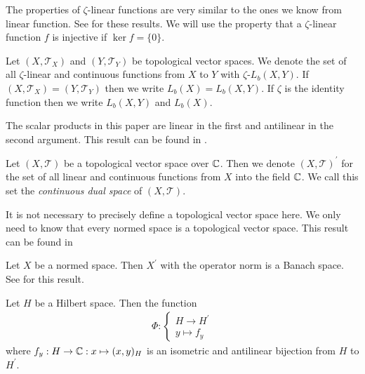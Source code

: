\begin{remark}
	The properties of $\zeta$-linear functions are very similar to the ones we know from linear function. See \cite[p. 138]{LinAG1&2} for these results. We will use the property that a $\zeta$-linear function $f$ is injective if $\ker f = \{0\}$.
\end{remark}


\begin{definition}
	Let $(X,\mathcal{T}_X)$ and $(Y,\mathcal{T}_Y)$ be topological vector spaces. We denote the set of all $\zeta$-linear and continuous functions from $X$ to $Y$ with $\zeta$-$L_b(X,Y)$. If $(X, \mathcal{T}_X) = (Y, \mathcal{T}_Y)$ then we write $L_b(X) = L_b(X,Y)$. If $\zeta$ is the identity function then we write $L_b(X,Y)$ and $L_b(X)$.
\end{definition}


\begin{remark}
	The scalar products in this paper are linear in the first and antilinear in the second argument. This result can be found in \cite[p. 41]{FAna1}.
\end{remark}

\begin{definition}
	Let $(X, \mathcal{T})$ be a topological vector space over $\mathbb{C}$. Then we denote $(X, \mathcal{T})^\prime$ for the set of all linear and continuous functions from $X$ into the field $\mathbb{C}$. We call this set the \textit{continuous dual space} of $(X, \mathcal{T})$.
\end{definition}

\begin{remark}
	It is not necessary to precisely define a topological vector space here. We only need to know that every normed space is a topological vector space. This result can be found in \cite[p. 18]{FAna1}
\end{remark}

\begin{remark}
	Let $X$ be a normed space. Then $X^\prime$ with the operator norm is a Banach space. See \cite[p. 25]{FAna1} for this result.
\end{remark}

\begin{proposition} \label{prop:riesz}
	Let $H$ be a Hilbert space. Then the function
	\begin{align*}
		\Phi: 
		\begin{cases}
			H \to H^\prime \\
			y \mapsto f_y
		\end{cases}
	\end{align*}
	where $f_y: H \to \mathbb{C}: x \mapsto (x,y)_H$ is an isometric and antilinear bijection from $H$ to $H^\prime$. 
\end{proposition}


